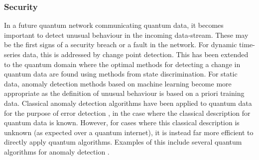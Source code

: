\documentclass[twocolumn, aps, rmp, amsmath, amssymb, nofootinbib, superscriptaddress, longbibliography, floatfix, table-of-contents, eqsecnum]{revtex4}
\begin{document}
\subsubsection{Security}

In a future quantum network communicating quantum data, it becomes important to detect unusual behaviour in the incoming data-stream. These may be the first signs of a security breach or a fault in the network. For dynamic time-series data, this is addressed by change point detection. This has been extended to the quantum domain \cite{bib:gael1, bib:gael2} where the optimal methods for detecting a change in quantum data are found using methods from state discrimination. For static data, anomaly detection methods based on machine learning become more appropriate as the definition of unusual behaviour is based on a priori training data. Classical anomaly detection algorithms have been applied to quantum data for the purpose of error detection \cite{bib:sara}, in the case where the classical description for quantum data is known. However, for cases where this classical description is unknown (as expected over a quantum internet), it is instead far more efficient to directly apply quantum algorithms. Examples of this include several quantum algorithms for anomaly detection \cite{bib:liu2018quantum}.


\end{document}
